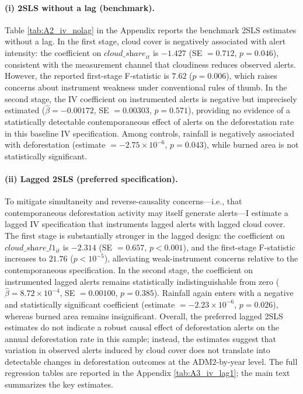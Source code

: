 \documentclass[hidelinks,12pt]{article}
\begin{document}
\paragraph{(i) 2SLS without a lag (benchmark).}
Table \ref{tab:A2_iv_nolag} in the Appendix reports the benchmark 2SLS estimates without a lag. In the first stage, cloud cover is negatively associated with alert intensity: the coefficient on $\textit{cloud\_share}_{it}$ is $-1.427$ (SE $=0.712$, $p=0.046$), consistent with the measurement channel that cloudiness reduces observed alerts. However, the reported first-stage F-statistic is $7.62$ ($p=0.006$), which raises concerns about instrument weakness under conventional rules of thumb. In the second stage, the IV coefficient on instrumented alerts is negative but imprecisely estimated ($\hat\beta=-0.00172$, SE $=0.00303$, $p=0.571$), providing no evidence of a statistically detectable contemporaneous effect of alerts on the deforestation rate in this baseline IV specification. Among controls, rainfall is negatively associated with deforestation (estimate $=-2.75\times10^{-6}$, $p=0.043$), while burned area is not statistically significant.

\paragraph{(ii) Lagged 2SLS (preferred specification).}
To mitigate simultaneity and reverse-causality concerns—i.e., that contemporaneous deforestation activity may itself generate alerts—I estimate a lagged IV specification that instruments lagged alerts with lagged cloud cover. The first stage is substantially stronger in the lagged design: the coefficient on $\textit{cloud\_share\_l1}_{it}$ is $-2.314$ (SE $=0.657$, $p<0.001$), and the first-stage F-statistic increases to $21.76$ ($p<10^{-5}$), alleviating weak-instrument concerns relative to the contemporaneous specification. In the second stage, the coefficient on instrumented lagged alerts remains statistically indistinguishable from zero ($\hat\beta=8.72\times10^{-4}$, SE $=0.00100$, $p=0.385$). Rainfall again enters with a negative and statistically significant coefficient (estimate $=-2.23\times10^{-6}$, $p=0.026$), whereas burned area remains insignificant. Overall, the preferred lagged 2SLS estimates do not indicate a robust causal effect of deforestation alerts on the annual deforestation rate in this sample; instead, the estimates suggest that variation in observed alerts induced by cloud cover does not translate into detectable changes in deforestation outcomes at the ADM2-by-year level. The full regression tables are reported in the Appendix \ref{tab:A3_iv_lag1}; the main text summarizes the key estimates.
\end{document}
